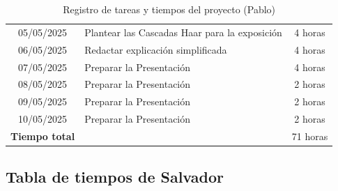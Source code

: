 \documentclass[a4paper]{article}
\begin{document}
\begin{table}[H]
\begin{tabular}{|c|p{10cm}|c|}
    05/05/2025 & Plantear las Cascadas Haar para la exposición & 4 horas \\
    06/05/2025 & Redactar explicación simplificada & 4 horas \\
    07/05/2025 & Preparar la Presentación & 4 horas \\
    08/05/2025 & Preparar la Presentación & 2 horas \\
    09/05/2025 & Preparar la Presentación & 2 horas \\
    10/05/2025 & Preparar la Presentación & 2 horas \\
    \textbf{Tiempo total} & & 71 horas \\
    \hline
    \end{tabular}
    \caption{Registro de tareas y tiempos del proyecto (Pablo)}
    \end{table}
    

\subsection{Tabla de tiempos de Salvador}
\end{document}
